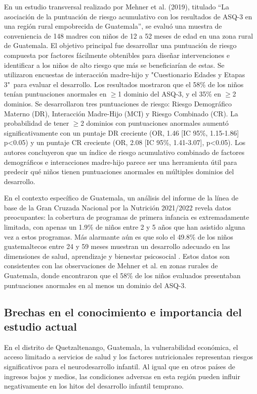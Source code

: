 \documentclass[11pt,letterpaper]{report}
\newcommand{\asq}{"Cuestionario Edades y Etapas 3"}
\begin{document}
En un estudio transversal realizado por Mehner et al. (2019), titulado
``La asociación de la puntuación de riesgo acumulativo con los resultados de
ASQ-3 en una región rural empobrecida de Guatemala'', se evaluó una muestra de
conveniencia de 148 madres con niños de 12 a 52 meses de edad en una zona rural
de Guatemala. El objetivo principal fue desarrollar una puntuación de riesgo
compuesta por factores fácilmente obtenibles para diseñar intervenciones e
identificar a los niños de alto riesgo que más se beneficiarían de estas. Se
utilizaron encuestas de interacción madre-hijo y \asq\ para evaluar el
desarrollo. Los resultados mostraron que el 58\% de los niños tenían
puntuaciones anormales en $\ge$1 dominio del ASQ-3, y el 35\% en $\ge$2
dominios. Se desarrollaron tres puntuaciones de riesgo: Riesgo Demográfico
Materno (DR), Interacción Madre-Hijo (MCI) y Riesgo Combinado (CR). La
probabilidad de tener $\ge$2 dominios con puntuaciones anormales aumentó
significativamente con un puntaje DR creciente (OR, 1.46 [IC 95\%, 1.15-1.86]
p<0.05) y un puntaje CR creciente (OR, 2.08 [IC 95\%, 1.41-3.07], p<0.05). Los
autores concluyeron que un índice de riesgo acumulativo combinado de factores
demográficos e interacciones madre-hijo parece ser una herramienta útil para
predecir qué niños tienen puntuaciones anormales en múltiples dominios del
desarrollo. \cite{CMehner2019}

En el contexto específico de Guatemala, un análisis del informe de la  línea de
base de la Gran Cruzada Nacional por la Nutrición 2021/2022 revela  datos
preocupantes: la cobertura de programas de primera infancia es extremadamente
limitada, con apenas un 1.9\% de niños entre 2 y 5 años que han asistido alguna
vez a estos programas. Más alarmante aún es que solo el 49.8\% de los niños
guatemaltecos entre 24 y 59 meses muestran un desarrollo adecuado  en las
dimensiones de salud, aprendizaje y bienestar psicosocial \cite{SESAN2022}.
Estos datos son consistentes con las observaciones de Mehner et al.
\cite{CMehner2019} en zonas rurales de Guatemala, donde encontraron que el 58\%
de los niños evaluados presentaban puntuaciones anormales en al menos un
dominio del ASQ-3.

\subsection{Brechas en el conocimiento e importancia del estudio actual}
En el distrito de Quetzaltenango, Guatemala, la vulnerabilidad económica, el
acceso limitado a servicios de salud y los factores nutricionales representan
riesgos significativos para el neurodesarrollo infantil. Al igual que en otros
países de ingresos bajos y medios, las condiciones adversas en esta región
pueden influir negativamente en los hitos del desarrollo infantil temprano.
\end{document}
